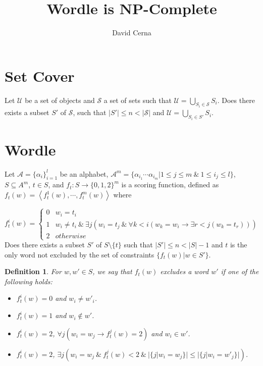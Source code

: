 \documentclass[10pt,a4paper]{article}
\author{David Cerna}
\title{Wordle is NP-Complete}
\newtheorem{definition}{Definition}
\begin{document}
\maketitle
\section{Set Cover}
Let  $\mathcal{U}$ be a set of objects and $\mathcal{S}$ a set of sets such that $\mathcal{U} =\bigcup_{S_i\in \mathcal{S}} S_i$. Does there exists a subset $S'$ of $\mathcal{S}$, such that $\vert S'\vert \leq n< \vert \mathcal{S}\vert$ and 
$\mathcal{U} =\bigcup_{S_i\in S'} S_i$.

\section{Wordle}
Let $\mathcal{A}= \{\alpha_{i}\}^{l}_{i=1}$ be an alphabet, $\mathcal{A}^{m} =\{ \alpha_{i_1}\cdots \alpha_{i_m}\vert 1\leq j\leq m\ \& \ 1\leq i_j\leq l\}$,  $S\subseteq A^m$, $t\in S$, and  $f_t:S\rightarrow \{0,1,2\}^m$ is a scoring function, defined as $f_t(w) = \left\langle f_t^1(w),\cdots, f_t^{m}(w)\right\rangle$ where

$$f_t^i(w) =\left\lbrace \begin{array}{cc}
0 &  w_i = t_i \\
1 & w_i \not = t_i\ \&\ \exists j(w_i = t_j \ \& \ \forall k< i(w_k =w_i \rightarrow \exists r< j (w_k=t_r)))\\
2 & otherwise
\end{array}\right.$$
Does there exists a subset $S'$ of $S\setminus \{t\}$ such that $\vert S'\vert \leq n< \vert S\vert-1 $ and $t$ is the only word not excluded by the set of constraints $\{f_t(w)\vert w\in S'\}$. 

\begin{definition}
For $w,w'\in S$, we say that $f_t(w)$ excludes a word $w'$ if one of the following holds: 

\begin{itemize}
\item $f_t^i(w) = 0$ and $w_i\not= w'_i $. 
\item $f_t^i(w) = 1$ and $w_i \not \in w'$.
\item $f_t^i(w) = 2$, $\forall j( w_i = w_j\rightarrow f_t^j(w) = 2)$ and $w_i\in w'$.
\item $f_t^i(w) = 2$,  $\exists j( w_i = w_j \ \&\ f_t^j(w) < 2 \ \& \ \vert\{j\vert w_i=w_j\}\vert\leq \vert\{j\vert w_i=w'_j\}\vert)$.
\end{itemize}
\end{definition}
\end{document}
